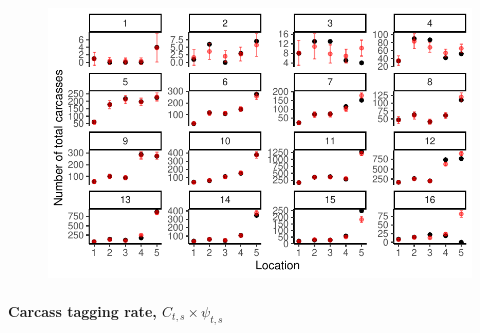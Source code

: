 \documentclass[
  letterpaper,
  DIV=11,
  numbers=noendperiod]{scrartcl}
\let\oldparagraph\paragraph
\renewcommand{\paragraph}[1]{\oldparagraph{#1}\mbox{}}
\begin{document}
\begin{figure}[H]

{\centering \includegraphics{KaleDoc_files/figure-pdf/unnamed-chunk-5-1.pdf}

}

\end{figure}

\hypertarget{carcass-tagging-rate-c_ts-times-psi_ts}{%
\paragraph{\texorpdfstring{Carcass tagging rate,
\(C_{t,s} \times \psi_{t,s}\)}{Carcass tagging rate, C\_\{t,s\} \textbackslash times \textbackslash psi\_\{t,s\}}}\label{carcass-tagging-rate-c_ts-times-psi_ts}}
\end{document}
